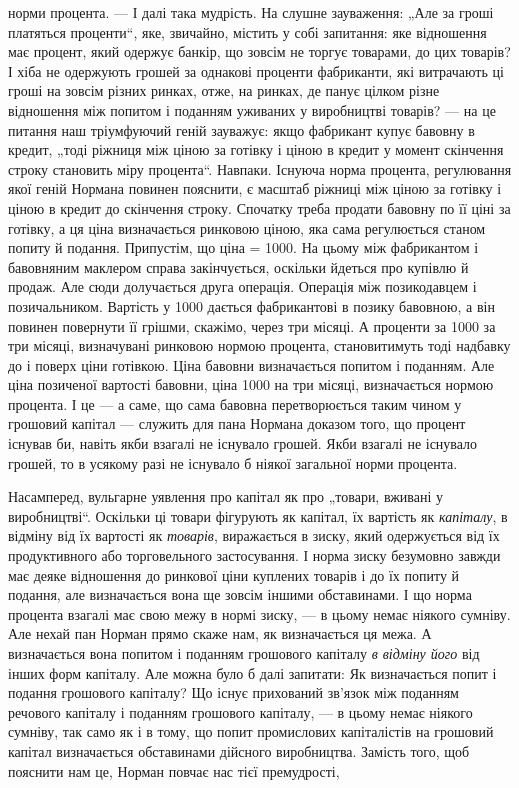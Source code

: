 \parcont{}  %
норми процента. — І далі така мудрість. На слушне зауваження:
„Але за гроші платяться проценти“, яке, звичайно, містить у собі
запитання: яке відношення має процент, який одержує банкір,
що зовсім не торгує товарами, до цих товарів? І хіба не одержують грошей за однакові проценти
фабриканти, які витрачають
ці гроші на зовсім різних ринках, отже, на ринках, де панує
цілком різне відношення між попитом і поданням уживаних у виробництві товарів? — на це питання наш
тріумфуючий геній зауважує: якщо фабрикант купує бавовну в кредит, „тоді ріжниця між ціною за
готівку і ціною в кредит у момент скінчення строку становить міру процента“. Навпаки. Існуюча норма
процента, регулювання якої геній Нормана повинен пояснити, є масштаб ріжниці
між ціною за готівку і ціною в кредит до скінчення строку. Спочатку треба продати бавовну по її ціні
за готівку, а ця ціна визначається ринковою ціною, яка сама регулюється станом попиту
й подання. Припустім, що ціна = 1000. На цьому
між фабрикантом і бавовняним маклером справа закінчується,
оскільки йдеться про купівлю й продаж. Але сюди долучається
друга операція. Операція між позикодавцем і позичальником. Вартість у 1000 дається
фабрикантові в позику бавовною, а він повинен повернути її грішми, скажімо, через три місяці. А
проценти за 1000 за три місяці, визначувані
ринковою нормою процента, становитимуть тоді надбавку до і поверх ціни готівкою. Ціна бавовни
визначається попитом і поданням.
Але ціна позиченої вартості бавовни, ціна 1000 на
три місяці, визначається нормою процента. І це — а саме, що сама
бавовна перетворюється таким чином у грошовий капітал — служить для пана Нормана доказом того, що
процент існував би, навіть
якби взагалі не існувало грошей. Якби взагалі не існувало грошей,
то в усякому разі не існувало б ніякої загальної норми процента.

Насамперед, вульгарне уявлення про капітал як про „товари,
вживані у виробництві“. Оскільки ці товари фігурують як капітал, їх вартість як \emph{капіталу}, в відміну
від їх вартості як \emph{товарів}, виражається в зиску, який одержується від їх продуктивного або
торговельного застосування. І норма зиску безумовно
завжди має деяке відношення до ринкової ціни куплених товарів
і до їх попиту й подання, але визначається вона ще зовсім іншими
обставинами. І що норма процента взагалі має свою межу в нормі
зиску, — в цьому немає ніякого сумніву. Але нехай пан Норман
прямо скаже нам, як визначається ця межа. А визначається
вона попитом і поданням грошового капіталу \emph{в відміну його} від
інших форм капіталу. Але можна було б далі запитати: Як визначається попит і подання грошового
капіталу? Що існує прихований зв’язок між поданням речового капіталу і поданням грошового капіталу,
— в цьому немає ніякого сумніву, так само як
і в тому, що попит промислових капіталістів на грошовий капітал визначається обставинами дійсного
виробництва. Замість
того, щоб пояснити нам це, Норман повчає нас тієї премудрості,
\parbreak{}  %
